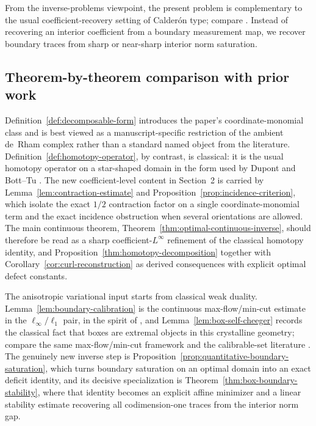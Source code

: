 \documentclass[11pt,letterpaper]{article}
\numberwithin{equation}{section}
\theoremstyle{plain}
\theoremstyle{definition}
\theoremstyle{remark}
\begin{document}
From the inverse-problems viewpoint, the present problem is complementary to
the usual coefficient-recovery setting of Calder\'on type; compare
\cite{Calderon1980,Uhlmann2009}. Instead of recovering an interior coefficient
from a boundary measurement map, we recover boundary traces from sharp or
near-sharp interior norm saturation.

\subsection{Theorem-by-theorem comparison with prior work}

Definition~\ref{def:decomposable-form} introduces the paper's
coordinate-monomial class and is best viewed as a manuscript-specific
restriction of the ambient de~Rham complex rather than a standard named object
from the literature. Definition~\ref{def:homotopy-operator}, by contrast, is
classical: it is the usual homotopy operator on a star-shaped domain in the
form used by Dupont and Bott--Tu \cite{DupontBook1978,BottTu1982}. The new
coefficient-level content in Section~2 is carried by
Lemma~\ref{lem:contraction-estimate} and
Proposition~\ref{prop:incidence-criterion}, which isolate the exact $1/2$
contraction factor on a single coordinate-monomial term and the exact
incidence obstruction when several orientations are allowed. The main
continuous theorem, Theorem~\ref{thm:optimal-continuous-inverse}, should
therefore be read as a sharp coefficient-$L^\infty$ refinement of the
classical homotopy identity, and
Proposition~\ref{thm:homotopy-decomposition} together with
Corollary~\ref{cor:curl-reconstruction} as derived consequences with explicit
optimal defect constants.

The anisotropic variational input starts from classical weak duality.
Lemma~\ref{lem:boundary-calibration} is the continuous max-flow/min-cut
estimate in the $\ell_\infty/\ell_1$ pair, in the spirit of
\cite{Strang2010}, and Lemma~\ref{lem:box-self-cheeger} records the classical
fact that boxes are extremal objects in this crystalline geometry; compare the
same max-flow/min-cut framework and the calibrable-set literature
\cite{Strang2010,CasellesChambolleMollNovaga2008}. The genuinely new inverse
step is Proposition~\ref{prop:quantitative-boundary-saturation}, which turns
boundary saturation on an optimal domain into an exact deficit identity, and
its decisive specialization is Theorem~\ref{thm:box-boundary-stability}, where
that identity becomes an explicit affine minimizer and a linear stability
estimate recovering all codimension-one traces from the interior norm gap.
\end{document}
